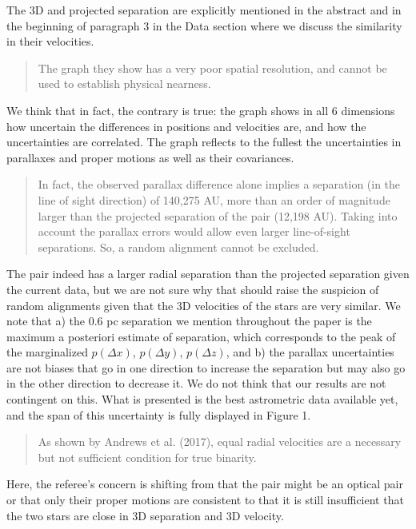 \documentclass[12pt]{article}
\begin{document}
The 3D and projected separation are explicitly mentioned in the abstract and in
the beginning of paragraph 3 in the Data section where we discuss the similarity
in their velocities.

\begin{quote}
The graph they show has a very poor spatial resolution, and cannot be
used to establish physical nearness.
\end{quote}

We think that in fact, the contrary is true: the graph shows in all 6
dimensions how uncertain the differences in positions and velocities
are, and how the uncertainties are correlated. The graph reflects to the
fullest the uncertainties in parallaxes and proper motions as well as
their covariances.

\begin{quote}
In fact, the observed parallax difference alone implies a separation (in
the line of sight direction) of 140,275 AU, more than an order of
magnitude larger than the projected separation of the pair (12,198 AU).
Taking into account the parallax errors would allow even larger
line-of-sight separations. So, a random alignment cannot be excluded.
\end{quote}

The pair indeed has a larger radial separation than the projected
separation given the current data, but we are not sure why that should
raise the suspicion of random alignments given that the 3D
velocities of the stars are very similar. We note that a) the 0.6 pc
separation we mention throughout the paper is the maximum a posteriori
estimate of separation, which corresponds to the peak of the
marginalized $p(\Delta x)$, $p(\Delta y)$, $p(\Delta z)$, and b) the
parallax uncertainties are not biases that go in one direction to
increase the separation but may also go in the other direction to
decrease it. We do not think that our results are not contingent
on this.
What is presented is the best astrometric data available yet, and the span of
this uncertainty is fully displayed in Figure 1.

\begin{quote}
As shown by Andrews et al. (2017), equal radial velocities are a
necessary but not sufficient condition for true binarity.
\end{quote}

Here, the referee's concern is shifting from that the pair might be an
optical pair or that only their proper motions are consistent to that it
is still insufficient that the two stars are close in 3D separation and
3D velocity.
\end{document}
